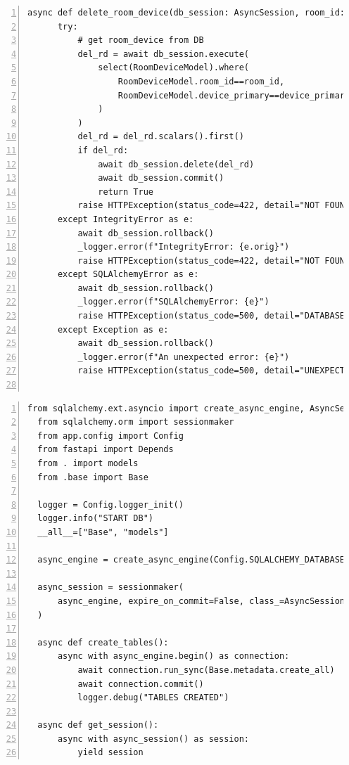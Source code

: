 \documentclass[12pt, letterpaper]{article}
\begin{document}
\begin{lstlisting}[frame=single, style=py, numbers=left, label={lst:dbqueries}, caption={db: queries.py}]
  async def delete_room_device(db_session: AsyncSession, room_id: int, device_primary_key: int):
      try:
          # get room_device from DB
          del_rd = await db_session.execute(
              select(RoomDeviceModel).where(
                  RoomDeviceModel.room_id==room_id,
                  RoomDeviceModel.device_primary==device_primary_key
              )
          )
          del_rd = del_rd.scalars().first()
          if del_rd:
              await db_session.delete(del_rd)
              await db_session.commit()
              return True
          raise HTTPException(status_code=422, detail="NOT FOUND")
      except IntegrityError as e:
          await db_session.rollback()
          _logger.error(f"IntegrityError: {e.orig}")
          raise HTTPException(status_code=422, detail="NOT FOUND")
      except SQLAlchemyError as e:
          await db_session.rollback()
          _logger.error(f"SQLAlchemyError: {e}")
          raise HTTPException(status_code=500, detail="DATABASE ERROR")
      except Exception as e:
          await db_session.rollback()
          _logger.error(f"An unexpected error: {e}")
          raise HTTPException(status_code=500, detail="UNEXPECTED DATABASE ERROR")
      
\end{lstlisting}
\begin{lstlisting}[frame=single, style=py, numbers=left, label={lst:init}, caption={db: \_\_init\_\_.py}]
  from sqlalchemy.ext.asyncio import create_async_engine, AsyncSession
  from sqlalchemy.orm import sessionmaker
  from app.config import Config
  from fastapi import Depends
  from . import models
  from .base import Base
  
  logger = Config.logger_init()
  logger.info("START DB")
  __all__=["Base", "models"]
  
  async_engine = create_async_engine(Config.SQLALCHEMY_DATABASE_URL)
  
  async_session = sessionmaker(
      async_engine, expire_on_commit=False, class_=AsyncSession
  )
  
  async def create_tables():
      async with async_engine.begin() as connection:
          await connection.run_sync(Base.metadata.create_all)
          await connection.commit()
          logger.debug("TABLES CREATED")
  
  async def get_session():
      async with async_session() as session:
          yield session
\end{lstlisting}
\end{document}
